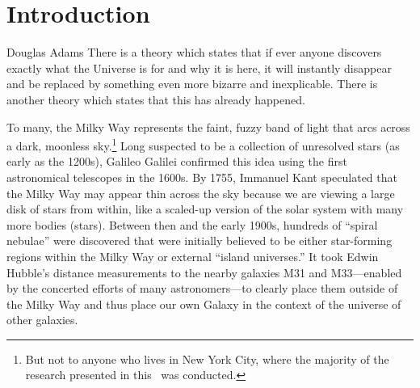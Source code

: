 \chapter[Introduction]{Introduction} \label{ch:intro}




\vspace{-16pt} \begin{chapquote}{Douglas Adams} \singlespacing There is a theory
which states that if ever anyone discovers exactly what the Universe is for and
why it is here, it will instantly disappear and be replaced by something even
more bizarre and inexplicable. There is another theory which states that this
has already happened. \end{chapquote} \vspace{-8pt}
\noindent\makebox[\linewidth]{\rule{0.5\textwidth}{0.5pt}} \vspace{1pt}

To many, the Milky Way represents the faint, fuzzy band of light that arcs
across a dark, moonless sky.\footnote{But not to anyone who lives in New York
City, where the majority of the research presented in this \article\ was
conducted.} Long suspected to be a collection of unresolved stars (as early as
the 1200s), Galileo Galilei confirmed this idea using the first astronomical
telescopes in the 1600s. By 1755, Immanuel Kant speculated that the Milky Way
may appear thin across the sky because we are viewing a large disk of stars from
within, like a scaled-up version of the solar system with many more bodies
(stars). Between then and the early 1900s, hundreds of ``spiral nebulae'' were
discovered that were initially believed to be either star-forming regions within
the Milky Way or external ``island universes.'' It took Edwin Hubble's distance
measurements to the nearby galaxies M31 and M33---enabled by the concerted
efforts of many astronomers---to clearly place them outside of the Milky Way and
thus place our own Galaxy in the context of the universe of other galaxies.

